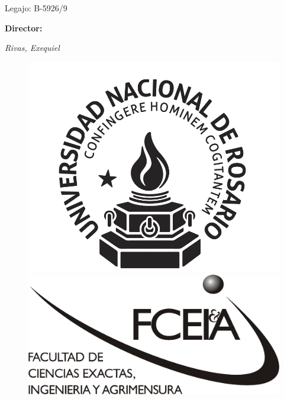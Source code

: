 \begin{titlepage}
	\large{Legajo: B-5926/9}
	
	\vspace{2\baselineskip} %

        \Large{\textbf{Director:}}
	
	
    {\itshape\LARGE Rivas, Exequiel}

	\vspace*{6\baselineskip} %
    
    \begin{figure}[h] %
	\centering
	\includegraphics[width=0.3\linewidth]{img/UNR.png} \hfill \includegraphics[width=0.3\linewidth]{img/FCEIA.jpeg}
	\end{figure}
    
    \vfill %
	
		
	\vspace{0.2\baselineskip} %
	
	

\end{titlepage}

